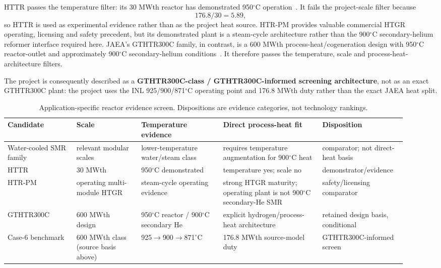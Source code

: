 HTTR passes the temperature filter: its 30 MWth reactor has demonstrated 950$^\circ$C operation~\cite{jaeahttr2026ops}.  It fails the project-scale filter because
\[
176.8/30=5.89,
\]
so HTTR is used as experimental evidence rather than as the project heat source.  HTR-PM provides valuable commercial HTGR operating, licensing and safety precedent, but its demonstrated plant is a steam-cycle architecture rather than the 900$^\circ$C secondary-helium reformer interface required here.  JAEA's GTHTR300C family, in contrast, is a 600 MWth process-heat/cogeneration design with 950$^\circ$C reactor-outlet and approximately 900$^\circ$C secondary-helium conditions~\cite{nishihara2007potential}.  It therefore passes the temperature, scale and process-heat-architecture filters.

The project is consequently described as a \textbf{GTHTR300C-class / GTHTR300C-informed screening architecture}, not as an exact GTHTR300C plant: the project uses the INL 925/900/871$^\circ$C operating point and 176.8 MWth duty rather than the exact JAEA heat split.

\begin{table}[htbp]\centering\scriptsize
\caption{Application-specific reactor evidence screen.  Dispositions are evidence categories, not technology rankings.}
\label{tab:reactor-screen}
\begin{tabular}{p{0.16\linewidth}p{0.15\linewidth}p{0.19\linewidth}p{0.23\linewidth}p{0.19\linewidth}}
\toprule
Candidate & Scale & Temperature evidence & Direct process-heat fit & Disposition\\ \midrule
Water-cooled SMR family & relevant modular scales & lower-temperature water/steam class & requires temperature augmentation for 900$^\circ$C heat & comparator; not direct-heat basis\\
HTTR & 30 MWth~\cite{jaeahttr2026ops} & 950$^\circ$C demonstrated~\cite{jaeahttr2026ops} & temperature yes; scale no & demonstrator/evidence\\
HTR-PM & operating multi-module HTGR & steam-cycle operating evidence & strong HTGR maturity; operating plant is not 900$^\circ$C secondary-He SMR & safety/licensing comparator\\
GTHTR300C & 600 MWth design~\cite{nishihara2007potential} & 950$^\circ$C reactor / 900$^\circ$C secondary He~\cite{nishihara2007potential} & explicit hydrogen/process-heat architecture~\cite{nishihara2007potential} & retained design basis, conditional\\
Case-6 benchmark & 600 MWth class (source basis above) & 925$\rightarrow$900$\rightarrow$871$^\circ$C~\cite{inltev953,inltev961} & 176.8 MWth source-model duty~\cite{inltev961} & GTHTR300C-informed screen\\
\bottomrule
\end{tabular}
\end{table}

